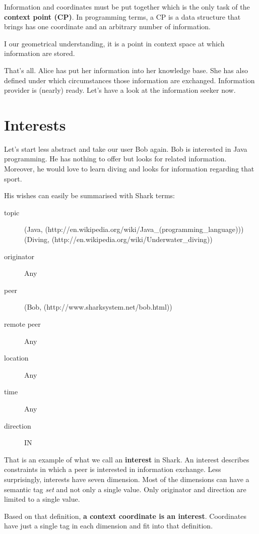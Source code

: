 Information and coordinates must be put together which is the only task of the {\bf context point (CP)}. In programming terms, a CP is a data structure that brings has one coordinate and an arbitrary number of information.

I our geometrical understanding, it is a point in context space at which information are stored.

That's all. Alice has put her information into her knowledge base. She has also defined under which circumstances those information are exchanged. Information provider is (nearly) ready. Let's have a look at the information seeker now.

\section{Interests}
Let's start less abstract and take our user Bob again. Bob is interested in Java programming. He has nothing to offer but looks for related information. Moreover, he would love to learn diving and looks for information regarding that sport.

His wishes can easily be summarised with Shark terms:

\begin{description}
    \item[topic] 
(Java, (http://en.wikipedia.org/wiki/Java\_(programming\_language))) \\
(Diving, (http://en.wikipedia.org/wiki/Underwater\_diving))    

\item[originator] 
Any
    \item[peer] 
(Bob, (http://www.sharksystem.net/bob.html))
    \item[remote peer] 
Any
    \item[location] 
Any
    \item[time] 
Any
    \item[direction] 
IN
\end{description}

That is an example of what we call an {\bf interest} in Shark. An interest describes constraints in which a peer is interested in information exchange.
Less surprisingly, interests have seven dimension. Most of the dimensions can have a semantic tag {\it set} and not only a single value. Only originator and direction are limited to a single value.

Based on that definition, {\bf a context coordinate is an interest}. 
Coordinates have just a single tag in each dimension and fit into that definition.

